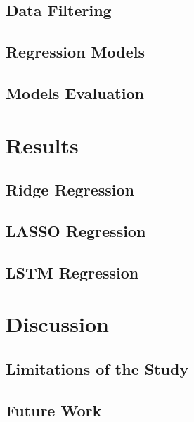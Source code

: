 \documentclass[a4paper, 11pt]{article}
\begin{document}
\subsection{Data Filtering}

\subsection{Regression Models}

\subsection{Models Evaluation}

\section{Results}
\subsection{Ridge Regression}

\subsection{LASSO Regression}

\subsection{LSTM Regression}

\section{Discussion}

\subsection{Limitations of the Study}

\subsection{Future Work}



\end{document}

